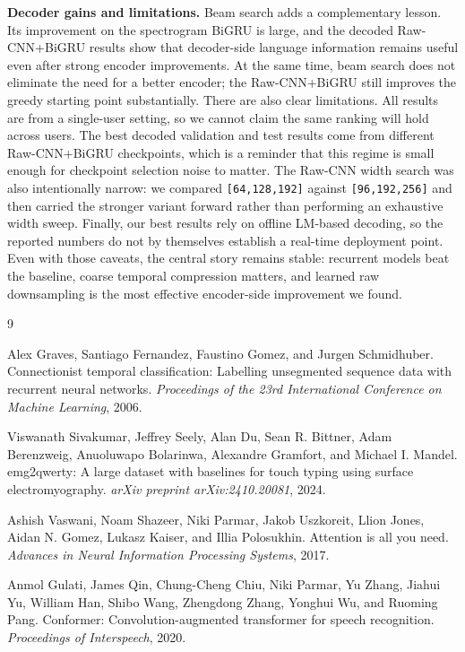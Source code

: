 \noindent\textbf{Decoder gains and limitations.} Beam search adds a complementary lesson. Its improvement on the spectrogram BiGRU is large, and the decoded Raw-CNN+BiGRU results show that decoder-side language information remains useful even after strong encoder improvements. At the same time, beam search does not eliminate the need for a better encoder; the Raw-CNN+BiGRU still improves the greedy starting point substantially. There are also clear limitations. All results are from a single-user setting, so we cannot claim the same ranking will hold across users. The best decoded validation and test results come from different Raw-CNN+BiGRU checkpoints, which is a reminder that this regime is small enough for checkpoint selection noise to matter. The Raw-CNN width search was also intentionally narrow: we compared \texttt{[64,128,192]} against \texttt{[96,192,256]} and then carried the stronger variant forward rather than performing an exhaustive width sweep. Finally, our best results rely on offline LM-based decoding, so the reported numbers do not by themselves establish a real-time deployment point. Even with those caveats, the central story remains stable: recurrent models beat the baseline, coarse temporal compression matters, and learned raw downsampling is the most effective encoder-side improvement we found.

\makeatletter
{}
\makeatother
\begin{references}{9}

Alex Graves, Santiago Fernandez, Faustino Gomez, and Jurgen Schmidhuber.
Connectionist temporal classification: Labelling unsegmented sequence data with recurrent neural networks.
\textit{Proceedings of the 23rd International Conference on Machine Learning}, 2006.

Viswanath Sivakumar, Jeffrey Seely, Alan Du, Sean R. Bittner, Adam Berenzweig, Anuoluwapo Bolarinwa, Alexandre Gramfort, and Michael I. Mandel.
emg2qwerty: A large dataset with baselines for touch typing using surface electromyography.
\textit{arXiv preprint arXiv:2410.20081}, 2024.

Ashish Vaswani, Noam Shazeer, Niki Parmar, Jakob Uszkoreit, Llion Jones, Aidan N. Gomez, Lukasz Kaiser, and Illia Polosukhin.
Attention is all you need.
\textit{Advances in Neural Information Processing Systems}, 2017.

Anmol Gulati, James Qin, Chung-Cheng Chiu, Niki Parmar, Yu Zhang, Jiahui Yu, William Han, Shibo Wang, Zhengdong Zhang, Yonghui Wu, and Ruoming Pang.
Conformer: Convolution-augmented transformer for speech recognition.
\textit{Proceedings of Interspeech}, 2020.

\end{references}
